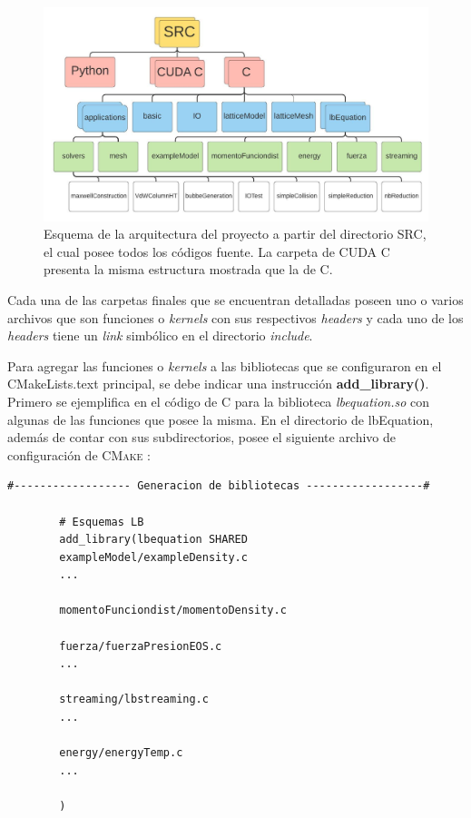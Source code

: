\begin{figure}[htbp]
	\centering
	\includegraphics[width=\textwidth]{figs/cap3/arquitectura_del_proyecto_LBCUDA_Test}
	\caption{Esquema de la arquitectura del proyecto a partir del directorio SRC, el cual posee todos los códigos fuente. La carpeta de CUDA C presenta la misma estructura mostrada que la de C.}
	\label{fig:arq_proyecto}	
\end{figure}

\newpage

Cada una de las carpetas finales que se encuentran detalladas poseen uno o varios archivos que son funciones o \textit{kernels} con sus respectivos \textit{headers} y cada uno de los \textit{headers} tiene un \textit{link} simbólico en el directorio \textit{include}.

Para agregar las funciones o \textit{kernels} a las bibliotecas que se configuraron en el CMakeLists.text principal, se debe indicar una instrucción \textbf{add\_library()}. Primero se ejemplifica en el código de \textsc{C} para la biblioteca \textit{lbequation.so} con algunas de las funciones que posee la misma. En el directorio de lbEquation, además de contar con sus subdirectorios, posee el siguiente archivo de configuración de \textsc{CMake} :

{\footnotesize
	\begin{frame}{}
		\begin{lstlisting}[frame=single]
#------------------ Generacion de bibliotecas ------------------#
		
		# Esquemas LB
		add_library(lbequation SHARED 
		exampleModel/exampleDensity.c
		...
		
		momentoFunciondist/momentoDensity.c
		
		fuerza/fuerzaPresionEOS.c
		...
		
		streaming/lbstreaming.c
		...
		
		energy/energyTemp.c
		...
		
		)
		\end{lstlisting}
		
	\end{frame}
}

